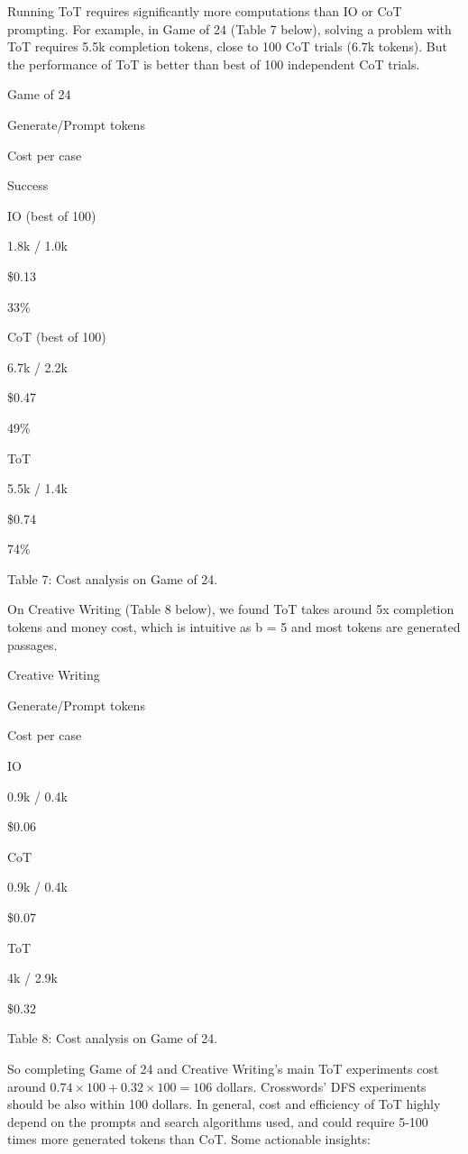 \documentclass[
]{article}
\begin{document}
Running ToT requires significantly more computations than IO or CoT
prompting. For example, in Game of 24 (Table 7 below), solving a problem
with ToT requires 5.5k completion tokens, close to 100 CoT trials (6.7k
tokens). But the performance of ToT is better than best of 100
independent CoT trials.

Game of 24

Generate/Prompt tokens

Cost per case

Success

IO (best of 100)

1.8k / 1.0k

\$0.13

33\%

CoT (best of 100)

6.7k / 2.2k

\$0.47

49\%

ToT

5.5k / 1.4k

\$0.74

74\%

Table 7: Cost analysis on Game of 24.

On Creative Writing (Table 8 below), we found ToT takes around 5x
completion tokens and money cost, which is intuitive as b = 5 and most
tokens are generated passages.

Creative Writing

Generate/Prompt tokens

Cost per case

IO

0.9k / 0.4k

\$0.06

CoT

0.9k / 0.4k

\$0.07

ToT

4k / 2.9k

\$0.32

Table 8: Cost analysis on Game of 24.

So completing Game of 24 and Creative Writing's main ToT experiments
cost around \(0.74 \times 100 + 0.32 \times 100 = 106\) dollars.
Crosswords' DFS experiments should be also within 100 dollars. In
general, cost and efficiency of ToT highly depend on the prompts and
search algorithms used, and could require 5-100 times more generated
tokens than CoT. Some actionable insights:
\end{document}
